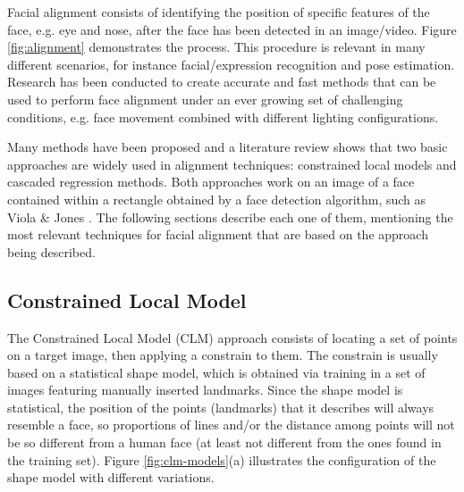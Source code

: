 Facial alignment consists of identifying the position of specific features of the face, e.g. eye and nose, after the face has been detected in an image/video. Figure \ref{fig:alignment} demonstrates the process. This procedure is relevant in many different scenarios, for instance facial/expression recognition and pose estimation. Research has been conducted to create accurate and fast methods that can be used to perform face alignment under an ever growing set of challenging conditions, e.g. face movement combined with different lighting configurations.

Many methods have been proposed and a literature review shows that two basic approaches are widely used in alignment techniques: constrained local models and cascaded regression methods. Both approaches work on an image of a face contained within a rectangle obtained by a face detection algorithm, such as Viola \& Jones \parencite{viola2004robust}. The following sections describe each one of them, mentioning the most relevant techniques for facial alignment that are based on the approach being described.

\subsection{Constrained Local Model}

The Constrained Local Model (CLM) approach consists of locating a set of points on a target image, then applying a constrain to them. The constrain is usually based on a statistical shape model, which is obtained via training in a set of images featuring manually inserted landmarks. Since the shape model is statistical, the position of the points (landmarks) that it describes will always resemble a face, so proportions of lines and/or the distance among points will not be so different from a human face (at least not different from the ones found in the training set). Figure \ref{fig:clm-models}(a) illustrates the configuration of the shape model with different variations.

